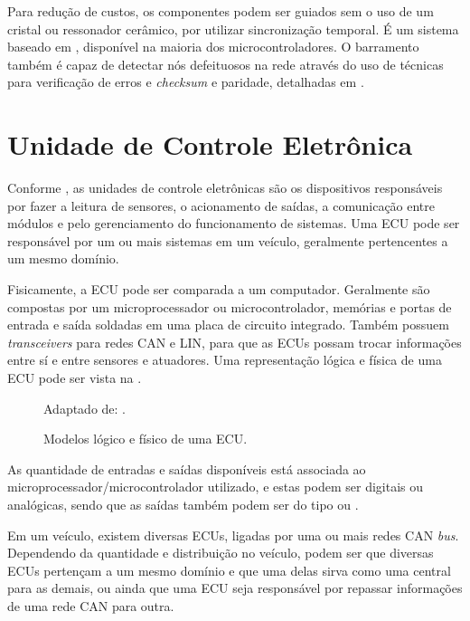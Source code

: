 Para redução de custos, os componentes podem ser guiados sem o uso de um cristal ou ressonador cerâmico, por utilizar sincronização temporal. É um sistema baseado em , disponível na maioria dos microcontroladores. O barramento também é capaz de detectar nós defeituosos na rede através do uso de técnicas para verificação de erros e \emph{checksum} e paridade, detalhadas em .

\section{Unidade de Controle Eletrônica}
\label{cap:ecu}

Conforme , as unidades de controle eletrônicas são os dispositivos responsáveis por fazer a leitura de sensores, o acionamento de saídas, a comunicação entre módulos e pelo gerenciamento do funcionamento de sistemas. Uma ECU pode ser responsável por um ou mais sistemas em um veículo, geralmente pertencentes a um mesmo domínio.

Fisicamente, a ECU pode ser comparada a um computador. Geralmente são compostas por um microprocessador ou microcontrolador, memórias e portas de entrada e saída soldadas em uma placa de circuito integrado. Também possuem \emph{transceivers} para redes CAN e LIN, para que as ECUs possam trocar informações entre sí e entre sensores e atuadores. Uma representação lógica e física de uma ECU pode ser vista na .

\begin{figure}[htb]
	\centering
	\caption{Modelos lógico e físico de uma ECU.}
	Adaptado de: .
	\label{fig:cap2_ecu_image}
\end{figure}

As quantidade de entradas e saídas disponíveis está associada ao microprocessador/microcontrolador utilizado, e estas podem ser digitais ou analógicas, sendo que as saídas também podem ser do tipo  ou .

Em um veículo, existem diversas ECUs, ligadas por uma ou mais redes CAN \emph{bus}. Dependendo da quantidade e distribuição no veículo, podem ser que diversas ECUs pertençam a um mesmo domínio e que uma delas sirva como uma central para as demais, ou ainda que uma ECU seja responsável por repassar informações de uma rede CAN para outra.

